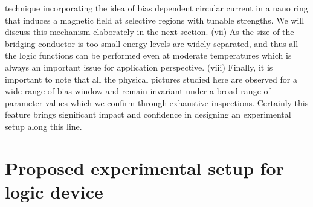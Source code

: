 \documentclass[doublecol]{epl2}
\begin{document}
technique incorporating the idea of bias dependent circular current in a 
nano ring that induces a magnetic field at selective regions with tunable
strengths. We will discuss this mechanism elaborately in the next section.
(vii) As the size of the bridging conductor is too small energy levels are
widely separated, and thus all the logic functions can be performed even 
at moderate temperatures which is always an important issue for application
perspective. (viii) Finally, it is important to note that all the physical 
pictures studied here are observed for a wide range of bias window and remain 
invariant under a broad range of parameter values which we confirm through 
exhaustive inspections. Certainly this feature brings significant impact 
and confidence in designing an experimental setup along this line.

\section{Proposed experimental setup for logic device}
\end{document}
